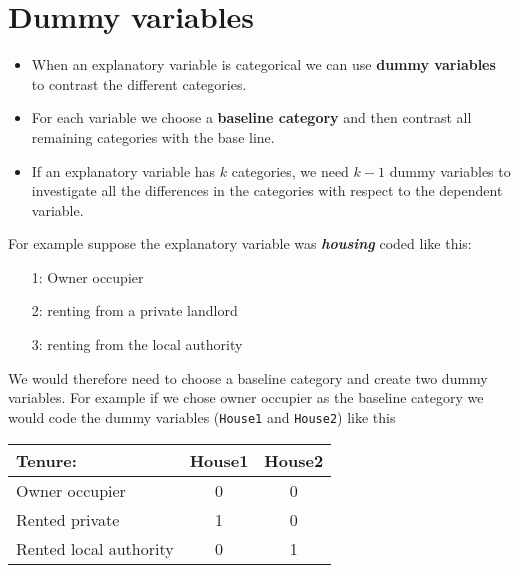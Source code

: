\documentclass[a4paper,12pt]{article}
\begin{document}
\section*{Dummy variables}
\begin{itemize}
\item When an explanatory variable is categorical we can use \textbf{dummy variables} to contrast
the different categories. 
\item For each variable we choose a \textbf{baseline category} and then
contrast all remaining categories with the base line.
\item If an explanatory variable
has $k$ categories, we need $k-1$ dummy variables to investigate all the differences in
the categories with respect to the dependent variable.
\end{itemize}

For example suppose the explanatory variable was \textbf{\textit{housing}} coded like this:
\begin{itemize}
	\item[1:] Owner occupier
	\item[2:] renting from a private landlord
	\item[3:] renting from the local authority
\end{itemize}

\noindent We would therefore need to choose a baseline category and create two dummy
variables. For example if we chose owner occupier as the baseline category we
would code the dummy variables (\texttt{House1} and \texttt{House2}) like this

\begin{center}
\begin{tabular}{|l|c|c|} \hline 
	Tenure: &House1 &House2\\ \hline \hline
	Owner occupier &0& 0\\ \hline
	Rented private &1 &0\\ \hline
	Rented local authority &0 &1\\ \hline
\end{tabular}

\end{center}
\end{document}
